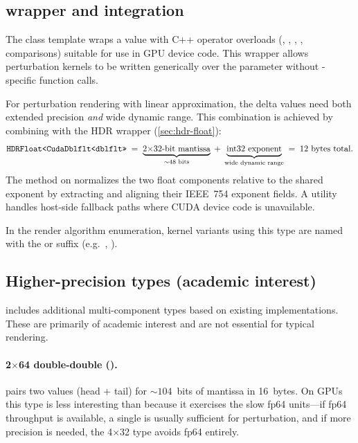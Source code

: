 \subsection{ wrapper and  integration}
\label{subsec:ep-cudadblflt}

The  class template wraps a  value with
C++ operator overloads (\code{+}, \code{-}, \code{*}, \code{/}, comparisons)
suitable for use in GPU device code.  This wrapper allows perturbation kernels to be
written generically over the  parameter without
-specific function calls.

For perturbation rendering with linear approximation, the delta values need
both extended precision \emph{and} wide dynamic range.  This combination is achieved by
combining  with the HDR wrapper
(\cref{sec:hdr-float}):
\begingroup\footnotesize
\[
  \texttt{HDRFloat<CudaDblflt<dblflt>>} \;=\;
    \underbrace{\text{2$\times$32-bit mantissa}}_{\sim\text{48~bits}}
    \;+\;
    \underbrace{\text{int32 exponent}}_{\text{wide dynamic range}}
    \;=\; \text{12~bytes total.}
\]
\endgroup
The  method on  normalizes the two float
components relative to the shared exponent by extracting and aligning their
IEEE~754 exponent fields.  A  utility handles
host-side fallback paths where CUDA device code is unavailable.

In the render algorithm enumeration, kernel variants using this type are named
with the  or  suffix (e.g.\
, ).

\subsection{Higher-precision types (academic interest)}
\label{subsec:ep-higher-prec}

\FractalShark{} includes additional multi-component types based on existing
implementations.  These are primarily of academic interest and are not
essential for typical rendering.

\paragraph{2\texorpdfstring{$\times$}{x}64 double-double ().}
\code{MattDbldbl} pairs two \code{double} values (head + tail) for
${\sim}104$~bits of mantissa in 16~bytes.  On GPUs this type is less interesting
than \code{dblflt} because it exercises the slow fp64 units---if fp64
throughput is available, a single \code{double} is usually sufficient for
perturbation, and if more precision is needed, the 4$\times$32 type avoids
fp64 entirely.

